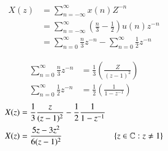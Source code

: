 \documentclass[journal,12pt,twocolumn]{IEEEtran}
\theoremstyle{remark}
\begin{document}
\begin{align}
X(z) &= \sum_{n = -\infty}^{\infty} x(n) Z^{-n} \\
 &= \sum_{n = -\infty}^{\infty} (\frac{n}{3} - \frac{1}{2})  u(n)  z^{-n} \\
 &= \sum_{n=0}^{\infty} \frac{n}{3}  z^{-n} - \sum_{n=0}^{\infty} \frac{1}{2}  z^{-n} 
\end{align}

\begin{align} \sum_{n=0}^{\infty} \frac{n}{3}  z^{-n} &= \frac{1}{3}  \left(\frac{Z}{(z-1)^{2}}\right) \\
\sum_{n=0}^{\infty} \frac{1}{2}  z^{-n} &=  \frac{1}{2}  \left(\frac{1}{1- z^{-1}}\right) 
\end{align}
\begin{align}
X(z) &= \frac{1}{3}  \frac{z}{(z-1)^{2}} - \frac{1}{2}  \frac{1}{1-z^{-1}} \\
X(z) &= {\frac{5z-3 z^{2}}{6(z-1)^{2}}}&\left\{z\in\mathbb{C} : z \neq 1\right\} 
\end{align}

\end{document}
